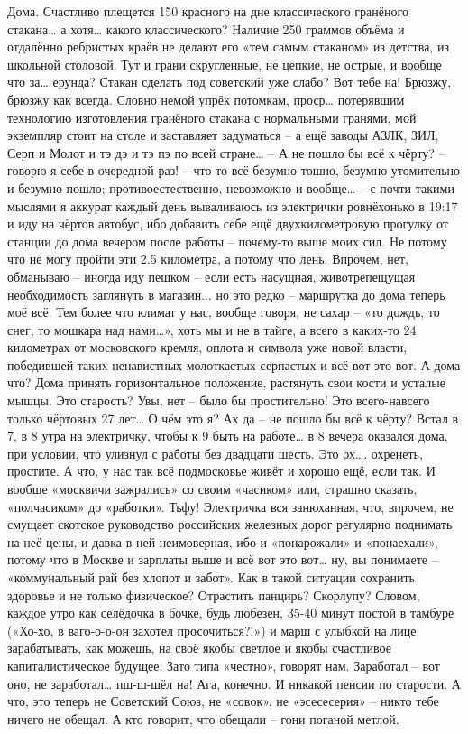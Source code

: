Дома. Счастливо плещется 150 красного на дне классического гранёного стакана… а хотя… какого классического? Наличие 250 граммов объёма и отдалённо ребристых краёв не делают его «тем самым стаканом» из детства, из школьной столовой. Тут и грани скругленные, не цепкие, не острые, и вообще что за… ерунда? Стакан сделать под советский уже слабо? Вот тебе на! Брюзжу, брюзжу как всегда. Словно немой упрёк потомкам, проср… потерявшим технологию изготовления гранёного стакана с нормальными гранями, мой экземпляр стоит на столе и заставляет задуматься – а ещё заводы АЗЛК, ЗИЛ, Серп и Молот и тэ дэ и тэ пэ по всей стране…
– А не пошло бы всё к чёрту? – говорю я себе в очередной раз! – что-то всё безумно тошно, безумно утомительно и безумно пошло; противоестественно, невозможно и вообще… – с почти такими мыслями я аккурат каждый день вываливаюсь из электрички ровнёхонько в 19:17 и иду на чёртов автобус, ибо добавить себе ещё двухкилометровую прогулку от станции до дома вечером после работы – почему-то выше моих сил. Не потому что не могу пройти эти 2.5 километра, а потому что лень. Впрочем, нет, обманываю – иногда иду пешком – если есть насущная, животрепещущая необходимость заглянуть в магазин... но это редко – маршрутка до дома теперь моё всё. Тем более что климат у нас, вообще говоря, не сахар – «то дождь, то снег, то мошкара над нами…», хоть мы и не в тайге, а всего в каких-то 24 километрах от московского кремля, оплота и символа уже новой власти, победившей таких ненавистных молоткастых-серпастых и всё вот это вот. А дома что? Дома принять горизонтальное положение, растянуть свои кости и усталые мышцы. Это старость? Увы, нет – было бы простительно! Это всего-навсего только чёртовых 27 лет…
О чём это я? Ах да – не пошло бы всё к чёрту? Встал в 7, в 8 утра на электричку, чтобы к 9 быть на работе… в 8 вечера оказался дома, при условии, что улизнул с работы без двадцати шесть. Это ох…. охренеть, простите. А что, у нас так всё подмосковье живёт и хорошо ещё, если так. И вообще «москвичи зажрались» со своим «часиком» или, страшно сказать, «полчасиком» до «работки». Тьфу! Электричка вся занюханная, что, впрочем, не смущает скотское руководство российских железных дорог регулярно поднимать на неё цены, и давка в ней неимоверная, ибо и «понарожали» и «понаехали», потому что в Москве и зарплаты выше и всё вот это вот… ну, вы понимаете – «коммунальный рай без хлопот и забот». Как в такой ситуации сохранить здоровье и не только физическое? Отрастить панцирь? Скорлупу?
Словом, каждое утро как селёдочка в бочке, будь любезен, 35-40 минут постой в тамбуре («Хо-хо, в ваго-о-о-он захотел просочиться?!») и марш с улыбкой на лице зарабатывать, как можешь, на своё якобы светлое и якобы счастливое капиталистическое будущее. Зато типа «честно», говорят нам. Заработал – вот оно, не заработал… пш-ш-шёл на! Ага, конечно. И никакой пенсии по старости. А что, это теперь не Советский Союз, не «совок», не «эсесесерия» – никто тебе ничего не обещал. А кто говорит, что обещали – гони поганой метлой.

